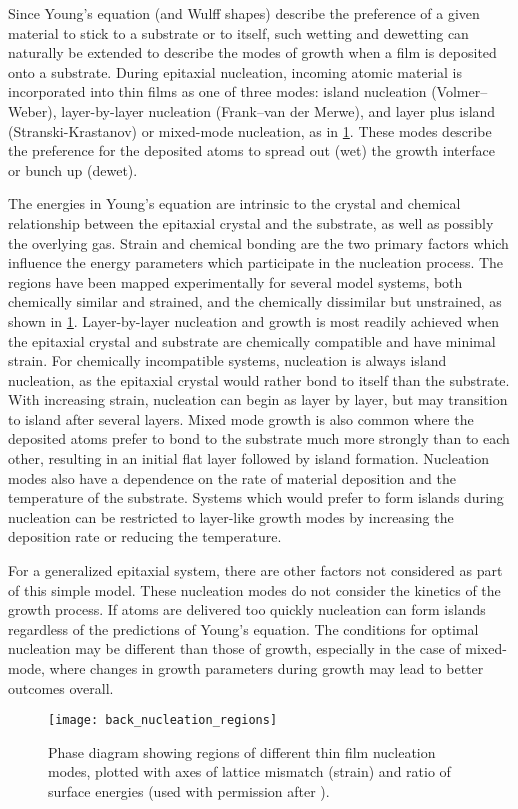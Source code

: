 Since Young's equation (and Wulff shapes) describe the preference of a given material to stick to a substrate or to itself, such wetting and dewetting can naturally be extended to describe the modes of growth when a film is deposited onto a substrate.
During epitaxial nucleation, incoming atomic material is incorporated into thin films as one of three modes: island nucleation (Volmer–Weber), layer-by-layer nucleation (Frank–van der Merwe), and layer plus island (Stranski-Krastanov) or mixed-mode nucleation\cite{Venables1984}, as in \cref{fig:back_nucleation_regions}.
These modes describe the preference for the deposited atoms to spread out (wet) the growth interface or bunch up (dewet).

The energies in Young's equation are intrinsic to the crystal and chemical relationship between the epitaxial crystal and the substrate, as well as possibly the overlying gas.
Strain and chemical bonding are the two primary factors which influence the energy parameters which participate in the nucleation process.
The regions have been mapped experimentally for several model systems, both chemically similar and strained, and the chemically dissimilar but unstrained, as shown in \cref{fig:back_nucleation_regions}.
Layer-by-layer nucleation and growth is most readily achieved when the epitaxial crystal and substrate are chemically compatible and have minimal strain\cite{Venables1984}.
For chemically incompatible systems, nucleation is always island nucleation, as the epitaxial crystal would rather bond to itself than the substrate.
With increasing strain, nucleation can begin as layer by layer, but may transition to island after several layers.
Mixed mode growth is also common where the deposited atoms prefer to bond to the substrate much more strongly than to each other, resulting in an initial flat layer followed by island formation\cite{Venables1984}.
Nucleation modes also have a dependence on the rate of material deposition and the temperature of the substrate.
Systems which would prefer to form islands during nucleation can be restricted to layer-like growth modes by increasing the deposition rate or reducing the temperature.

For a generalized epitaxial system, there are other factors not considered as part of this simple model.
These nucleation modes do not consider the kinetics of the growth process.
If atoms are delivered too quickly nucleation can form islands regardless of the predictions of Young's equation.
The conditions for optimal nucleation may be different than those of growth, especially in the case of mixed-mode, where changes in growth parameters during growth may lead to better outcomes overall.
\begin{figure}
 \centering \texttt{[image: back\_nucleation\_regions]}
 \caption[Nucleation phase diagram of surface energy and strain]{\label{fig:back_nucleation_regions}Phase diagram showing regions of different thin film nucleation modes, plotted with axes of lattice mismatch (strain) and ratio of surface energies (used with permission after \cite{ohring2001materials}).}
\end{figure}

